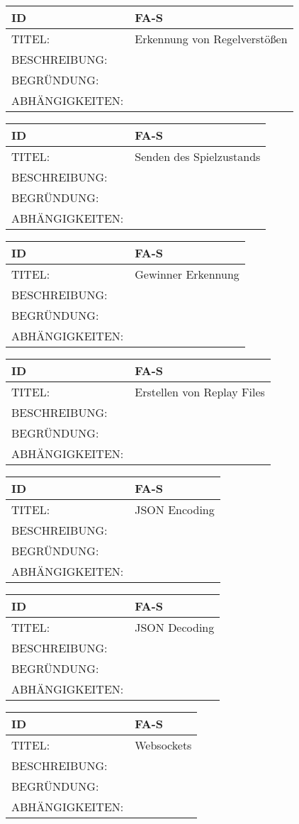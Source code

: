 \begin{tabularx}{16cm}{l|X}
\textbf{ID} & \textbf{FA-S} \\
\hline
TITEL: & Erkennung von Regelverstößen \\
\hline
BESCHREIBUNG: & \\
\hline
BEGRÜNDUNG: & \\
\hline
ABHÄNGIGKEITEN: & \\
\end{tabularx}

\begin{tabularx}{16cm}{l|X}
\textbf{ID} & \textbf{FA-S} \\
\hline
TITEL: & Senden des Spielzustands \\
\hline
BESCHREIBUNG: & \\
\hline
BEGRÜNDUNG: & \\
\hline
ABHÄNGIGKEITEN: & \\
\end{tabularx}

\begin{tabularx}{16cm}{l|X}
\textbf{ID} & \textbf{FA-S} \\
\hline
TITEL: & Gewinner Erkennung \\
\hline
BESCHREIBUNG: & \\
\hline
BEGRÜNDUNG: & \\
\hline
ABHÄNGIGKEITEN: & \\
\end{tabularx}

\begin{tabularx}{16cm}{l|X}
\textbf{ID} & \textbf{FA-S} \\
\hline
TITEL: & Erstellen von Replay Files \\
\hline
BESCHREIBUNG: & \\
\hline
BEGRÜNDUNG: & \\
\hline
ABHÄNGIGKEITEN: & \\
\end{tabularx}

\begin{tabularx}{16cm}{l|X}
\textbf{ID} & \textbf{FA-S} \\
\hline
TITEL: & JSON Encoding \\
\hline
BESCHREIBUNG: & \\
\hline
BEGRÜNDUNG: & \\
\hline
ABHÄNGIGKEITEN: & \\
\end{tabularx}

\begin{tabularx}{16cm}{l|X}
\textbf{ID} & \textbf{FA-S} \\
\hline
TITEL: & JSON Decoding \\
\hline
BESCHREIBUNG: & \\
\hline
BEGRÜNDUNG: & \\
\hline
ABHÄNGIGKEITEN: & \\
\end{tabularx}

\begin{tabularx}{16cm}{l|X}
\textbf{ID} & \textbf{FA-S} \\
\hline
TITEL: & Websockets \\
\hline
BESCHREIBUNG: & \\
\hline
BEGRÜNDUNG: & \\
\hline
ABHÄNGIGKEITEN: & \\
\end{tabularx}

